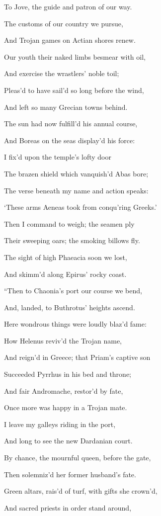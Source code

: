 To Jove, the guide and patron of our way.

The customs of our country we pursue,

And Trojan games on Actian shores renew.

Our youth their naked limbs besmear with oil,

And exercise the wrastlers’ noble toil;

Pleas’d to have sail’d so long before the wind,

And left so many Grecian towns behind.

The sun had now fulfill’d his annual course,

And Boreas on the seas display’d his force:

I fix’d upon the temple’s lofty door

The brazen shield which vanquish’d Abas bore;

The verse beneath my name and action speaks:

‘These arms Aeneas took from conqu’ring Greeks.’

Then I command to weigh; the seamen ply

Their sweeping oars; the smoking billows fly.

The sight of high Phaeacia soon we lost,

And skimm’d along Epirus’ rocky coast.

“Then to Chaonia’s port our course we bend,

And, landed, to Buthrotus’ heights ascend.

Here wondrous things were loudly blaz’d fame:

How Helenus reviv’d the Trojan name,

And reign’d in Greece; that Priam’s captive son

Succeeded Pyrrhus in his bed and throne;

And fair Andromache, restor’d by fate,

Once more was happy in a Trojan mate.

I leave my galleys riding in the port,

And long to see the new Dardanian court.

By chance, the mournful queen, before the gate,

Then solemniz’d her former husband’s fate.

Green altars, rais’d of turf, with gifts she crown’d,

And sacred priests in order stand around,

